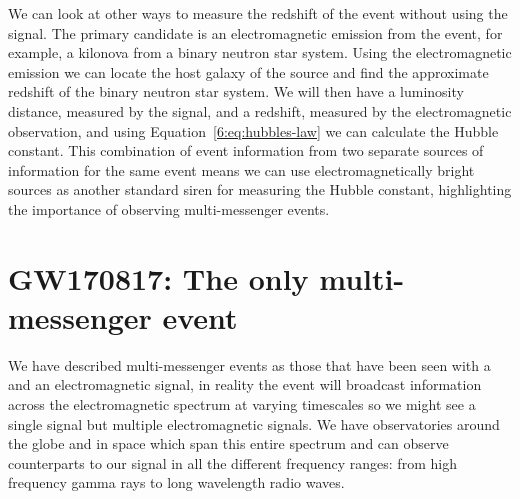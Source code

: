 We can look at other ways to measure the redshift of the event without using the \gwadj signal. The primary candidate is an electromagnetic emission from the event, for example, a kilonova from a binary neutron star system. Using the electromagnetic emission we can locate the host galaxy of the source and find the approximate redshift of the binary neutron star system. We will then have a luminosity distance, measured by the \gwadj signal, and a redshift, measured by the electromagnetic observation, and using Equation~\ref{6:eq:hubbles-law} we can calculate the Hubble constant. This combination of event information from two separate sources of information for the same event means we can use electromagnetically bright \gwadj sources as another standard siren for measuring the Hubble constant, highlighting the importance of observing multi-messenger events.

\section{\label{6:sec:gw170817}GW170817: The only multi-messenger event}

We have described multi-messenger events as those that have been seen with a \gw and an electromagnetic signal, in reality the event will broadcast information across the electromagnetic spectrum at varying timescales so we might see a single \gwadj signal but multiple electromagnetic signals. We have observatories around the globe and in space which span this entire spectrum and can observe counterparts to our \gwadj signal in all the different frequency ranges: from high frequency gamma rays to long wavelength radio waves. 

